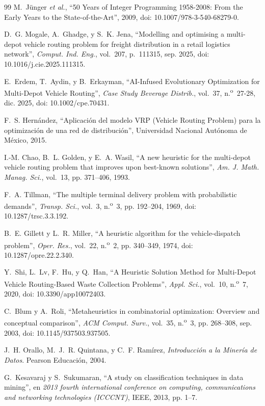 \begin{thebibliography}{99}
 M.~J\"unger \emph{et al.}, ``50 Years of Integer Programming 1958-2008: From the Early Years to the State-of-the-Art'', 2009, doi: 10.1007/978-3-540-68279-0.

 D.~G. Mogale, A.~Ghadge, y S.~K. Jena, ``Modelling and optimising a multi-depot vehicle routing problem for freight distribution in a retail logistics network'', \emph{Comput. Ind. Eng.}, vol.~207, p.~111315, sep. 2025, doi: 10.1016/j.cie.2025.111315.

 E.~Erdem, T.~Aydin, y B.~Erkayman, ``AI-Infused Evolutionary Optimization for Multi-Depot Vehicle Routing'', \emph{Case Study Beverage Distrib.}, vol.~37, n.\textsuperscript{o}~27-28, dic. 2025, doi: 10.1002/cpe.70431.

 F.~S. Hern\'andez, ``Aplicaci\'on del modelo VRP (Vehicle Routing Problem) para la optimizaci\'on de una red de distribuci\'on'', Universidad Nacional Aut\'onoma de M\'exico, 2015.

 I.-M. Chao, B.~L. Golden, y E.~A. Wasil, ``A new heuristic for the multi-depot vehicle routing problem that improves upon best-known solutions'', \emph{Am. J. Math. Manag. Sci.}, vol.~13, pp. 371--406, 1993.

 F.~A. Tillman, ``The multiple terminal delivery problem with probabilistic demands'', \emph{Transp. Sci.}, vol.~3, n.\textsuperscript{o}~3, pp. 192--204, 1969, doi: 10.1287/trsc.3.3.192.

 B.~E. Gillett y L.~R. Miller, ``A heuristic algorithm for the vehicle-dispatch problem'', \emph{Oper. Res.}, vol.~22, n.\textsuperscript{o}~2, pp. 340--349, 1974, doi: 10.1287/opre.22.2.340.

 Y.~Shi, L.~Lv, F.~Hu, y Q.~Han, ``A Heuristic Solution Method for Multi-Depot Vehicle Routing-Based Waste Collection Problems'', \emph{Appl. Sci.}, vol.~10, n.\textsuperscript{o}~7, 2020, doi: 10.3390/app10072403.

 C.~Blum y A.~Roli, ``Metaheuristics in combinatorial optimization: Overview and conceptual comparison'', \emph{ACM Comput. Surv.}, vol.~35, n.\textsuperscript{o}~3, pp. 268--308, sep. 2003, doi: 10.1145/937503.937505.

 J.~H. Orallo, M.~J.~R. Quintana, y C.~F. Ram\'irez, \emph{Introducci\'on a la Miner\'ia de Datos}. Pearson Educaci\'on, 2004.

 G.~Kesavaraj y S.~Sukumaran, ``A study on classification techniques in data mining'', en \emph{2013 fourth international conference on computing, communications and networking technologies (ICCCNT)}, IEEE, 2013, pp. 1--7.


\end{thebibliography}
